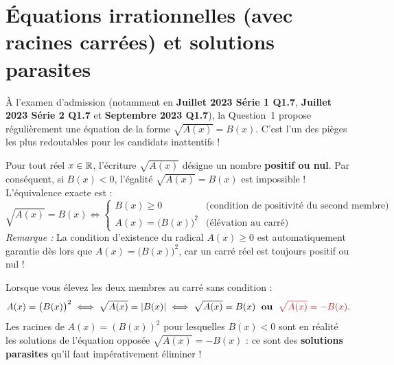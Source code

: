 \section{Équations irrationnelles (avec racines carrées) et solutions parasites}

À l'examen d'admission (notamment en \textbf{Juillet 2023 Série 1 Q1.7}, \textbf{Juillet 2023 Série 2 Q1.7} et \textbf{Septembre 2023 Q1.7}), la Question~1 propose régulièrement une équation de la forme $\sqrt{A(x)} = B(x)$. C'est l'un des pièges les plus redoutables pour les candidats inattentifs !

\begin{theoreme}[Équivalence fondamentale pour résoudre $\sqrt{A(x)} = B(x)$]
Pour tout réel $x \in \mathbb{R}$, l'écriture $\sqrt{A(x)}$ désigne un nombre \textbf{positif ou nul}. Par conséquent, si $B(x) < 0$, l'égalité $\sqrt{A(x)} = B(x)$ est impossible ! L'équivalence exacte est :
\[
    \boxed{\sqrt{A(x)} = B(x) \iff \begin{cases} B(x) \ge 0 & \text{(condition de positivité du second membre)} \\ A(x) = \bigl(B(x)\bigr)^2 & \text{(élévation au carré)} \end{cases}}
\]
\emph{Remarque :} La condition d'existence du radical $A(x) \ge 0$ est automatiquement garantie dès lors que $A(x) = \bigl(B(x)\bigr)^2$, car un carré réel est toujours positif ou nul !
\end{theoreme}

\begin{attention}
Lorsque vous élevez les deux membres au carré sans condition :
\[
    A(x) = \bigl(B(x)\bigr)^2 \iff \sqrt{A(x)} = |B(x)| \iff \sqrt{A(x)} = B(x) \;\text{ \textbf{ou} }\; \textcolor{warnred}{\sqrt{A(x)} = -B(x)}.
\]
Les racines de $A(x) = (B(x))^2$ pour lesquelles $B(x) < 0$ sont en réalité les solutions de l'équation opposée $\sqrt{A(x)} = -B(x)$ : ce sont des \textbf{solutions parasites} qu'il faut impérativement éliminer !
\end{attention}

